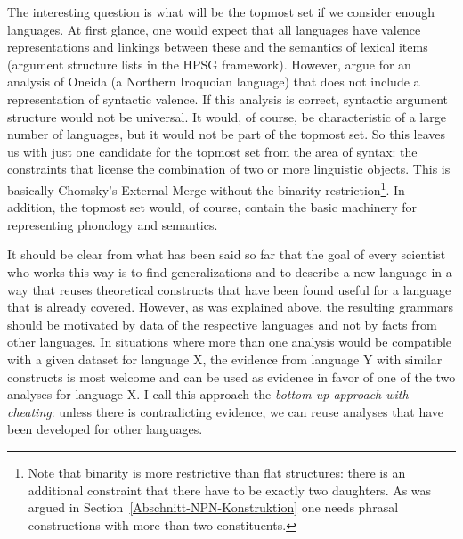 The interesting question is what will be the topmost set if we consider enough languages. At
first glance, one would expect that all languages have valence representations and linkings between
these and the semantics of lexical items (argument structure lists in the HPSG framework). However,
\citet{KM2012a} argue for an analysis of Oneida (a Northern Iroquoian language) that does not
include a representation of syntactic valence. If this analysis is correct, syntactic argument
structure would not be universal. It would, of course, be characteristic of a large number of
languages, but it would not be part of the topmost set. So this leaves us with just one candidate
for the topmost set from the area of syntax: the constraints that license the combination of two or more linguistic
objects. This is basically Chomsky's External Merge without the binarity restriction\footnote{
  Note that binarity is more restrictive than flat structures: there is an additional constraint
  that there have to be exactly two daughters. As was argued in Section~\ref{Abschnitt-NPN-Konstruktion} one needs phrasal
  constructions with more than two constituents.
}. In addition, the topmost set would, of course, contain the basic machinery for representing phonology and semantics.  


It should be clear from what has been said so far that the goal of every scientist who works this
way is to find generalizations and to describe a new language in a way that reuses theoretical constructs
that have been found useful for a language that is already covered. However, as was explained above,
the resulting grammars should be motivated by data of the respective languages and not by facts from
other languages. In situations where more than one analysis would be compatible with a given dataset
for language X, the evidence from language Y with similar constructs is most welcome and can be used
as evidence in favor of one of the two analyses for language X. I call this approach the
\emph{bottom-up approach with cheating}: unless there is contradicting evidence, we can reuse
analyses that have been developed for other languages.  

